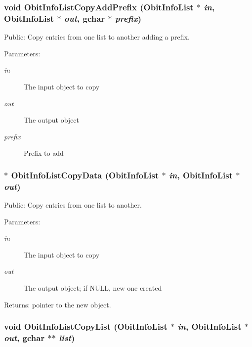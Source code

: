 \subsubsection{\setlength{\rightskip}{0pt plus 5cm}void Obit\-Info\-List\-Copy\-Add\-Prefix ({\bf Obit\-Info\-List} $\ast$ {\em in}, {\bf Obit\-Info\-List} $\ast$ {\em out}, gchar $\ast$ {\em prefix})}\label{ObitInfoList_8h_a8}


Public: Copy entries from one list to another adding a prefix. 

\begin{Desc}
\item[Parameters:]
\begin{description}
\item[{\em in}]The input object to copy \item[{\em out}]The output object \item[{\em prefix}]Prefix to add \end{description}
\end{Desc}
\subsubsection{$\ast$ Obit\-Info\-List\-Copy\-Data ({\bf Obit\-Info\-List} $\ast$ {\em in}, {\bf Obit\-Info\-List} $\ast$ {\em out})}\label{ObitInfoList_8h_a5}


Public: Copy entries from one list to another. 

\begin{Desc}
\item[Parameters:]
\begin{description}
\item[{\em in}]The input object to copy \item[{\em out}]The output object; if NULL, new one created \end{description}
\end{Desc}
\begin{Desc}
\item[Returns:]pointer to the new object. \end{Desc}
\subsubsection{\setlength{\rightskip}{0pt plus 5cm}void Obit\-Info\-List\-Copy\-List ({\bf Obit\-Info\-List} $\ast$ {\em in}, {\bf Obit\-Info\-List} $\ast$ {\em out}, gchar $\ast$$\ast$ {\em list})}\label{ObitInfoList_8h_a6}



